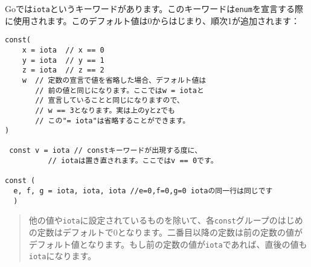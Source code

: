 Goでは\texttt{iota}というキーワードがあります。このキーワードは\texttt{enum}を宣言する際に使用されます。このデフォルト値は0からはじまり、順次1が追加されます：



\begin{lstlisting}[numbers=none]
const(
    x = iota  // x == 0
    y = iota  // y == 1
    z = iota  // z == 2
    w  // 定数の宣言で値を省略した場合、デフォルト値は
       // 前の値と同じになります。ここではw = iotaと
       // 宣言していることと同じになりますので、
       // w == 3となります。実は上のyとzでも
       // この"= iota"は省略することができます。
)

 const v = iota // constキーワードが出現する度に、
          // iotaは置き直されます。ここではv == 0です。

const ( 
  e, f, g = iota, iota, iota //e=0,f=0,g=0 iotaの同一行は同じです
  )
\end{lstlisting}

\begin{quote}
他の値や\texttt{iota}に設定されているものを除いて、各\texttt{const}グループのはじめの定数はデフォルトで0となります。二番目以降の定数は前の定数の値がデフォルト値となります。もし前の定数の値が\texttt{iota}であれば、直後の値も\texttt{iota}になります。
\end{quote}

